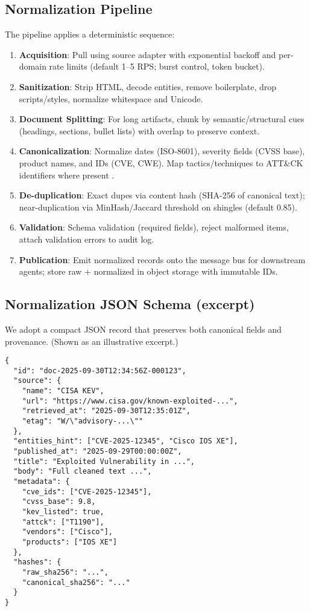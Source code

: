 \subsection{Normalization Pipeline}
The pipeline applies a deterministic sequence:
\begin{enumerate}
  \item \textbf{Acquisition}: Pull using source adapter with exponential backoff and per-domain rate limits (default 1--5 RPS; burst control, token bucket).
  \item \textbf{Sanitization}: Strip HTML, decode entities, remove boilerplate, drop scripts/styles, normalize whitespace and Unicode.
  \item \textbf{Document Splitting}: For long artifacts, chunk by semantic/structural cues (headings, sections, bullet lists) with overlap to preserve context.
  \item \textbf{Canonicalization}: Normalize dates (ISO-8601), severity fields (CVSS base), product names, and IDs (CVE, CWE). Map tactics/techniques to ATT\&CK identifiers where present \cite{mitre_attack}.
  \item \textbf{De-duplication}: Exact dupes via content hash (SHA-256 of canonical text); near-duplication via MinHash/Jaccard threshold on shingles (default 0.85).
  \item \textbf{Validation}: Schema validation (required fields), reject malformed items, attach validation errors to audit log.
  \item \textbf{Publication}: Emit normalized records onto the message bus for downstream agents; store raw + normalized in object storage with immutable IDs.
\end{enumerate}

\subsection{Normalization JSON Schema (excerpt)}
We adopt a compact JSON record that preserves both canonical fields and provenance. (Shown as an illustrative excerpt.)
\begin{verbatim}
{
  "id": "doc-2025-09-30T12:34:56Z-000123",
  "source": {
    "name": "CISA KEV",
    "url": "https://www.cisa.gov/known-exploited-...",
    "retrieved_at": "2025-09-30T12:35:01Z",
    "etag": "W/\"advisory-...\""
  },
  "entities_hint": ["CVE-2025-12345", "Cisco IOS XE"],
  "published_at": "2025-09-29T00:00:00Z",
  "title": "Exploited Vulnerability in ...",
  "body": "Full cleaned text ...",
  "metadata": {
    "cve_ids": ["CVE-2025-12345"],
    "cvss_base": 9.8,
    "kev_listed": true,
    "attck": ["T1190"],
    "vendors": ["Cisco"],
    "products": ["IOS XE"]
  },
  "hashes": {
    "raw_sha256": "...",
    "canonical_sha256": "..."
  }
}
\end{verbatim}

